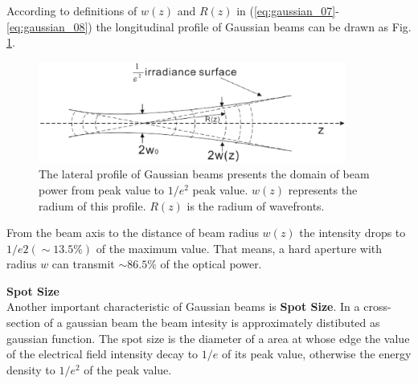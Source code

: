 According to definitions of $w(z)$ and $R(z)$ in (\ref{eq:gaussian_07}-\ref{eq:gaussian_08}) the longitudinal profile of Gaussian beams can be drawn as Fig. \ref{fig:gussian_profile}.
\begin{figure}[!ht]
\centering
\includegraphics[width=0.9\textwidth]{bilder/gussian_profile}
\caption{The lateral profile of Gaussian beams presents the domain of beam power from peak value to $1/e^2$ peak value. $w(z)$ represents the radium of this profile. $R(z)$ is the radium of wavefronts.}
\label{fig:gussian_profile}
\end{figure}
From the beam axis to the distance of beam radius $w(z)$ the intensity drops to $1/e2 (\sim13.5\%)$ of the maximum value. That means, a hard aperture with radius $w$ can transmit $\sim86.5\%$ of the optical power.

\textbf{Spot Size}\\
Another important characteristic of Gaussian beams is \textbf{Spot Size}. In a cross-section of a gaussian beam the beam intesity is approximately distibuted as gaussian function. The spot size is the diameter of a area at whose edge the value of the electrical field intensity decay to $1/e$ of its peak value, otherwise the energy density to $1/e^2$ of the peak value.
